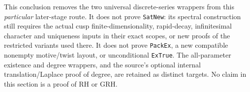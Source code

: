 This conclusion removes the two universal discrete-series wrappers
from this \emph{particular} later-stage route.  It does not prove
\texttt{SatNew}: its spectral construction still requires the
actual cusp finite-dimensionality, rapid-decay, infinitesimal
character and uniqueness inputs in their exact scopes, or new
proofs of the restricted variants used there.  It does not prove
\texttt{PackEx}, a new compatible nonempty motive/twist layout,
or unconditional \texttt{ExTrue}.  The all-parameter existence
and degree wrappers, and the source's optional internal
translation/Laplace proof of degree, are retained as distinct
targets.  No claim in this section is a proof of RH or GRH.

